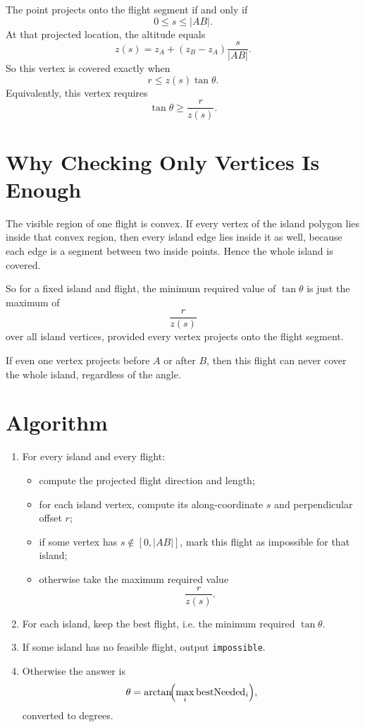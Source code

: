 \documentclass[11pt]{article}
\begin{document}
The point projects onto the flight segment if and only if
\[
    0 \le s \le |AB|.
\]
At that projected location, the altitude equals
\[
    z(s) = z_A + (z_B-z_A)\frac{s}{|AB|}.
\]
So this vertex is covered exactly when
\[
    r \le z(s)\tan\theta.
\]
Equivalently, this vertex requires
\[
    \tan\theta \ge \frac{r}{z(s)}.
\]

\section*{Why Checking Only Vertices Is Enough}

The visible region of one flight is convex. If every vertex of the island polygon lies inside that convex
region, then every island edge lies inside it as well, because each edge is a segment between two inside
points. Hence the whole island is covered.

So for a fixed island and flight, the minimum required value of $\tan\theta$ is just the maximum of
\[
    \frac{r}{z(s)}
\]
over all island vertices, provided every vertex projects onto the flight segment.

If even one vertex projects before $A$ or after $B$, then this flight can never cover the whole island,
regardless of the angle.

\section*{Algorithm}

\begin{enumerate}[leftmargin=*]
    \item For every island and every flight:
    \begin{itemize}[leftmargin=*]
        \item compute the projected flight direction and length;
        \item for each island vertex, compute its along-coordinate $s$ and perpendicular offset $r$;
        \item if some vertex has $s \notin [0,|AB|]$, mark this flight as impossible for that island;
        \item otherwise take the maximum required value
        \[
            \frac{r}{z(s)}.
        \]
    \end{itemize}
    \item For each island, keep the best flight, i.e. the minimum required $\tan\theta$.
    \item If some island has no feasible flight, output \texttt{impossible}.
    \item Otherwise the answer is
    \[
        \theta = \arctan\!\Bigl(\max_i \text{bestNeeded}_i\Bigr),
    \]
    converted to degrees.
\end{enumerate}
\end{document}
